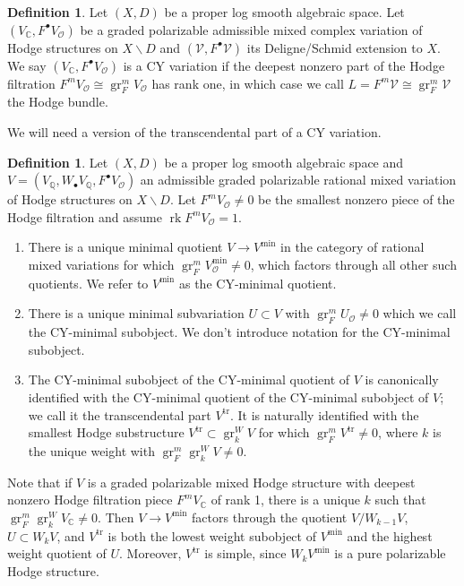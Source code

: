 \documentclass{amsart}
\newcommand{\bs}{\backslash}
\theoremstyle{definition}
\newtheorem{defn}[theorem]{Definition}
\theoremstyle{remark}
\def\bQ{\mathbb{Q}}
\def\bC{\mathbb{C}}
\def\cO{\mathcal{O}}
\def\cV{\mathcal{V}}
\def\gr{\operatorname{gr}}
\def\trans{\mathrm{tr}}
\def\mini{\mathrm{min}}
\def\rk{\operatorname{rk}}
\def\pmax{m}
\numberwithin{equation}{section}
\begin{document}
\begin{defn}
    Let $(X,D)$ be a proper log smooth algebraic space.  Let $(V_\bC,F^\bullet V_\cO)$ be a graded polarizable admissible mixed complex variation of Hodge structures on $X\bs D$ and $(\cV, F^\bullet \cV)$ its Deligne/Schmid extension to $X$.  We say $(V_\bC,F^\bullet V_\cO)$ is a CY variation if the deepest nonzero part of the Hodge filtration $F^{\pmax} V_\cO\cong\gr^\pmax_F V_\cO$ has rank one, in which case we call $L=F^\pmax\cV\cong\gr_F^\pmax\cV$ the Hodge bundle.  

\end{defn}


  



We will need a version of the transcendental part of a CY variation.
\begin{defn}\label{defn:minimal}Let $(X,D)$ be a proper log smooth algebraic space and $V=(V_\bQ,W_\bullet V_\bQ,F^\bullet V_\cO)$ an admissible graded polarizable rational mixed variation of Hodge structures on $X\bs D$.  Let $F^mV_\cO\neq 0$ be the smallest nonzero piece of the Hodge filtration and assume $\rk F^m V_\cO=1$.  
\begin{enumerate}
\item There is a unique minimal quotient $V\to V^\mathrm{min}$ in the category of rational mixed variations for which $\gr^m_F V_\cO^\mathrm{min}\neq 0$, which factors through all other such quotients.  We refer to $V^\mathrm{min}$ as the CY-minimal quotient.
\item There is a unique minimal subvariation $U\subset V$ with $\gr_F^m U_\cO\neq0$ which we call the CY-minimal subobject.  We don't introduce notation for the CY-minimal subobject.
\item The CY-minimal subobject of the CY-minimal quotient of $V$ is canonically identified with the CY-minimal quotient of the CY-minimal subobject of $V$; we call it the transcendental part $V^\trans$.  It is naturally identified with the smallest Hodge substructure $V^\trans\subset \gr_k^W V$ for which $\gr_F^m V^\trans\neq 0$, where $k$ is the unique weight with $\gr_F^m\gr^W_k V\neq 0$.
\end{enumerate}

\end{defn}
Note that if $V$ is a graded polarizable mixed Hodge structure with deepest nonzero Hodge filtration piece $F^mV_\bC$ of rank 1, there is a unique $k$ such that $\gr_F^m\gr^W_kV_\bC\neq 0$.  Then $V\to V^\mini$ factors through the quotient $V/W_{k-1}V$, $U\subset W_kV$, and $V^\trans$ is both the lowest weight subobject of $V^\mathrm{min}$ and the highest weight quotient of $U$.  Moreover, $V^\trans$ is simple, since $W_kV^\mini$ is a pure polarizable Hodge structure.
\end{document}
